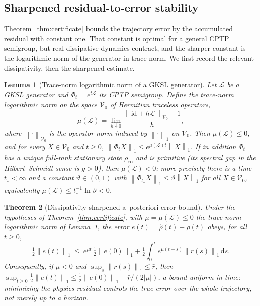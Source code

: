 \documentclass[twocolumn,aps,prxquantum,superscriptaddress,nofootinbib,floatfix,longbibliography]{revtex4-2}
\newtheorem{theorem}{Theorem}
\newtheorem{lemma}[theorem]{Lemma}
\newcommand{\calL}{\mathcal{L}}
\newcommand{\id}{\mathrm{id}}
\newcommand{\dd}{\mathrm{d}}
\newcommand{\norm}[1]{\left\lVert #1 \right\rVert}
\newcommand{\abs}[1]{\left\lvert #1 \right\rvert}
\newcommand{\rhohat}{\widehat{\rho}}
\begin{document}
\subsection{Sharpened residual-to-error stability}
\label{sec:surrogate_stability}

Theorem~\ref{thm:certificate} bounds the trajectory error by the accumulated residual with constant one. That constant is optimal for a general CPTP semigroup, but real dissipative dynamics contract, and the sharper constant is the logarithmic norm of the generator in trace norm. We first record the relevant dissipativity, then the sharpened estimate.

\begin{lemma}[Trace-norm logarithmic norm of a GKSL generator]
\label{lem:lognorm}
Let $\calL$ be a GKSL generator and $\Phi_t=e^{t\calL}$ its CPTP semigroup. Define the trace-norm logarithmic norm on the space $\mathcal{V}_0$ of Hermitian traceless operators,
\begin{equation}
\mu(\calL)=\lim_{h\downarrow0}\frac{\norm{\id+h\calL}_{\mathcal{V}_0}-1}{h},
\label{eq:lognorm_def}
\end{equation}
where $\norm{\cdot}_{\mathcal{V}_0}$ is the operator norm induced by $\norm{\cdot}_1$ on $\mathcal{V}_0$. Then $\mu(\calL)\le0$, and for every $X\in\mathcal{V}_0$ and $t\ge0$, $\norm{\Phi_t X}_1\le e^{\mu(\calL)t}\norm{X}_1$. If in addition $\Phi_t$ has a unique full-rank stationary state $\rho_\infty$ and is primitive (its spectral gap in the Hilbert--Schmidt sense is $g>0$), then $\mu(\calL)<0$; more precisely there is a time $t_\star<\infty$ and a constant $\vartheta\in(0,1)$ with $\norm{\Phi_{t_\star}X}_1\le\vartheta\norm{X}_1$ for all $X\in\mathcal{V}_0$, equivalently $\mu(\calL)\le t_\star^{-1}\ln\vartheta<0$.
\end{lemma}

\begin{theorem}[Dissipativity-sharpened a~posteriori error bound]
\label{thm:apost_stability}
Under the hypotheses of Theorem~\ref{thm:certificate}, with $\mu=\mu(\calL)\le0$ the trace-norm logarithmic norm of Lemma~\ref{lem:lognorm}, the error $e(t)=\rhohat(t)-\rho(t)$ obeys, for all $t\ge0$,
\begin{equation}
\tfrac12\norm{e(t)}_1\ \le\ e^{\mu t}\,\tfrac12\norm{e(0)}_1+\tfrac12\int_0^t e^{\mu(t-s)}\norm{r(s)}_1\,\dd s.
\label{eq:apost_stability}
\end{equation}
Consequently, if $\mu<0$ and $\sup_s\norm{r(s)}_1\le\bar r$, then $\sup_{t\ge0}\tfrac12\norm{e(t)}_1\le\tfrac12\norm{e(0)}_1+\bar r/(2\abs{\mu})$, a bound \emph{uniform in time}: minimizing the physics residual controls the true error over the whole trajectory, not merely up to a horizon.
\end{theorem}
\end{document}
